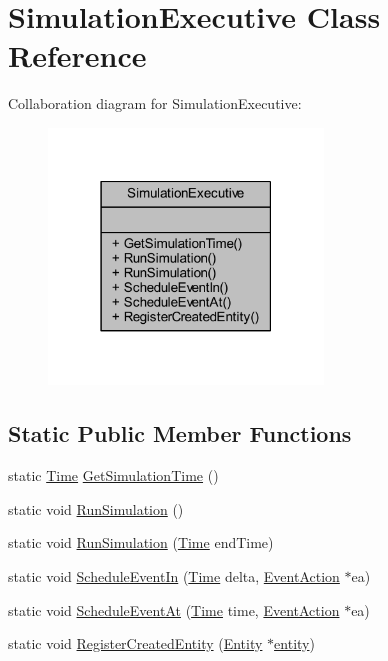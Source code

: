 \hypertarget{class_simulation_executive}{}\section{Simulation\+Executive Class Reference}
\label{class_simulation_executive}


Collaboration diagram for Simulation\+Executive\+:
\nopagebreak
\begin{figure}[H]
\begin{center}
\leavevmode
\includegraphics[width=207pt]{class_simulation_executive__coll__graph}
\end{center}
\end{figure}
\subsection*{Static Public Member Functions}
\begin{DoxyCompactItemize}
\item 
static \hyperlink{_simulation_executive_8h_ac2d3e0ba793497bcca555c7c2cf64ff3}{Time} \hyperlink{class_simulation_executive_aae5817b0bb67ac5453f3953174d20d9a}{Get\+Simulation\+Time} ()
\item 
static void \hyperlink{class_simulation_executive_aefcd760dfa5abac47f90871218f5a142}{Run\+Simulation} ()
\item 
static void \hyperlink{class_simulation_executive_aeb51e8a0457a294919d1b02068606e14}{Run\+Simulation} (\hyperlink{_simulation_executive_8h_ac2d3e0ba793497bcca555c7c2cf64ff3}{Time} end\+Time)
\item 
static void \hyperlink{class_simulation_executive_ac3d1456a2f8384c22e0fce64741eaba0}{Schedule\+Event\+In} (\hyperlink{_simulation_executive_8h_ac2d3e0ba793497bcca555c7c2cf64ff3}{Time} delta, \hyperlink{class_event_action}{Event\+Action} $\ast$ea)
\item 
static void \hyperlink{class_simulation_executive_ad060de243e8cb89fd7c7217d0c98c5c9}{Schedule\+Event\+At} (\hyperlink{_simulation_executive_8h_ac2d3e0ba793497bcca555c7c2cf64ff3}{Time} time, \hyperlink{class_event_action}{Event\+Action} $\ast$ea)
\item 
static void \hyperlink{class_simulation_executive_a6b97d77619c537a462c53ad32ed95004}{Register\+Created\+Entity} (\hyperlink{class_entity}{Entity} $\ast$\hyperlink{_entity_8h_ad79a57ed3105eb60d991a1aeb4a9dc44a428e8fcd53019fa239fa3419261e499e}{entity})
\end{DoxyCompactItemize}


